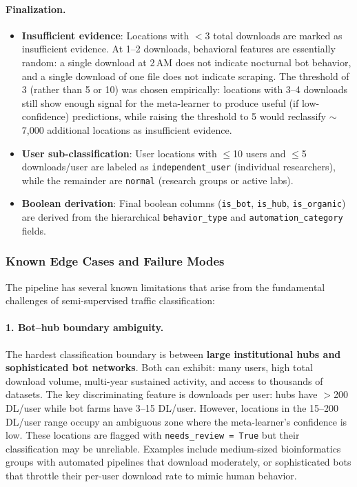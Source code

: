 \documentclass[11pt,a4paper]{article}
\begin{document}
\paragraph{Finalization.}

\begin{itemize}
    \item \textbf{Insufficient evidence}: Locations with $<$3 total downloads are marked as insufficient evidence. At 1--2 downloads, behavioral features are essentially random: a single download at 2\,AM does not indicate nocturnal bot behavior, and a single download of one file does not indicate scraping. The threshold of 3 (rather than 5 or 10) was chosen empirically: locations with 3--4 downloads still show enough signal for the meta-learner to produce useful (if low-confidence) predictions, while raising the threshold to 5 would reclassify $\sim$7,000 additional locations as insufficient evidence.
    \item \textbf{User sub-classification}: User locations with $\leq$10 users and $\leq$5 downloads/user are labeled as \texttt{independent\_user} (individual researchers), while the remainder are \texttt{normal} (research groups or active labs).
    \item \textbf{Boolean derivation}: Final boolean columns (\texttt{is\_bot}, \texttt{is\_hub}, \texttt{is\_organic}) are derived from the hierarchical \texttt{behavior\_type} and \texttt{automation\_category} fields.
\end{itemize}

\subsubsection{Known Edge Cases and Failure Modes}

The pipeline has several known limitations that arise from the fundamental challenges of semi-supervised traffic classification:

\paragraph{1. Bot--hub boundary ambiguity.} The hardest classification boundary is between \textbf{large institutional hubs and sophisticated bot networks}. Both can exhibit: many users, high total download volume, multi-year sustained activity, and access to thousands of datasets. The key discriminating feature is downloads per user: hubs have $>$200 DL/user while bot farms have 3--15 DL/user. However, locations in the 15--200 DL/user range occupy an ambiguous zone where the meta-learner's confidence is low. These locations are flagged with \texttt{needs\_review = True} but their classification may be unreliable. Examples include medium-sized bioinformatics groups with automated pipelines that download moderately, or sophisticated bots that throttle their per-user download rate to mimic human behavior.
\end{document}

